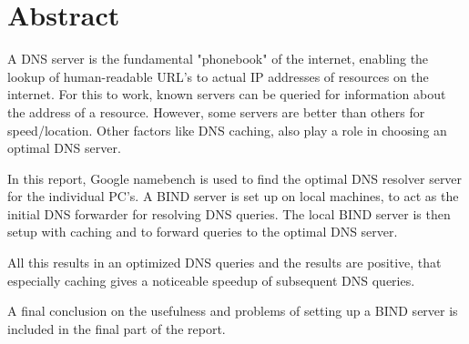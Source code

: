 \chapter*{Abstract}
A DNS server is the fundamental "phonebook" of the internet, enabling the lookup of human-readable URL's to actual IP addresses of resources on the internet. For this to work, known servers can be queried for information about the address of a resource. However, some servers are better than others for speed/location. Other factors like DNS caching, also play a role in choosing an optimal DNS server.

In this report, Google namebench is used to find the optimal DNS resolver server for the individual PC's. A BIND server is set up on local machines, to act as the initial DNS forwarder for resolving DNS queries. 
The local BIND server is then setup with caching and to forward queries to the optimal DNS server. 

All this results in an optimized DNS queries and the results are positive, that especially caching gives a noticeable speedup of subsequent DNS queries. 

A final conclusion on the usefulness and problems of setting up a BIND server is included in the final part of the report.

\setcounter{tocdepth}{1}
\tableofcontents